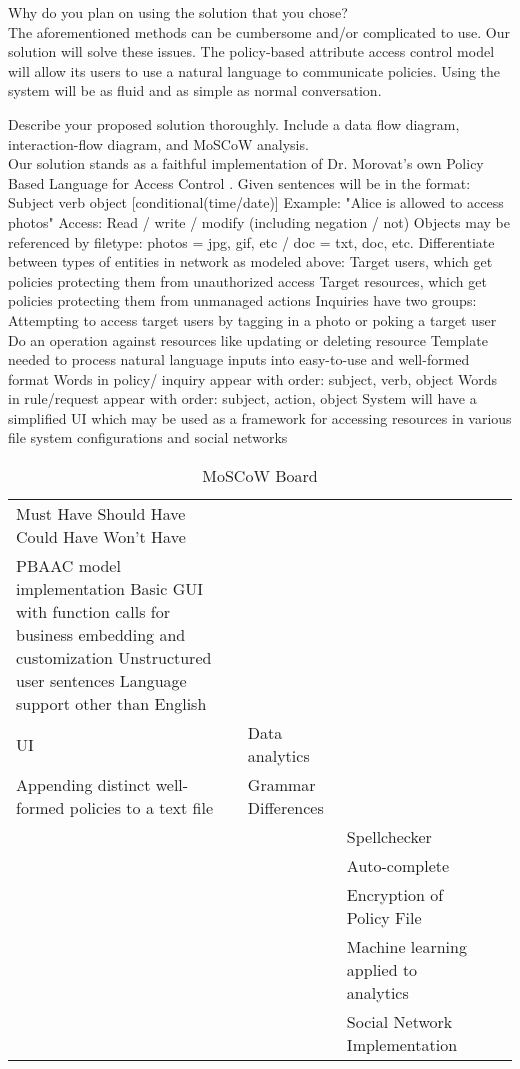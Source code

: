 \documentclass[12pt]{article}
\begin{document}
Why do you plan on using the solution that you chose? \\
The aforementioned methods can be cumbersome and/or complicated to use. Our solution will solve these issues. The policy-based attribute access control model will allow its users to use a natural language to communicate policies. Using the system will be as fluid and as simple as normal conversation. 

Describe your proposed solution thoroughly. Include a data flow diagram, interaction-flow diagram, and MoSCoW analysis. \\
Our solution stands as a faithful implementation of Dr. Morovat's own Policy Based Language for Access Control \cite{morovat16}.
Given sentences will be in the format: Subject verb object [conditional(time/date)]
Example: "Alice is allowed to access photos"
Access: Read / write / modify (including negation / not)
Objects may be referenced by filetype: photos = jpg, gif, etc / doc = txt, doc, etc.
Differentiate between types of entities in network as modeled above:
Target users, which get policies protecting them from unauthorized access
Target resources, which get policies protecting them from unmanaged actions
Inquiries have two groups:
Attempting to access target users by tagging in a photo or poking a target user
Do an operation against resources like updating or deleting resource
Template needed to process natural language inputs into easy-to-use and well-formed format
Words in policy/ inquiry appear with order: subject, verb, object
Words in rule/request appear with order: subject, action, object
System will have a simplified UI which may be used as a framework for accessing resources in various file system configurations and social networks

\begin{table}[]
\caption{MoSCoW Board}
\begin{tabular}{lllll}
 Must Have  Should Have  Could Have  Won't Have  \\
 PBAAC model implementation  Basic GUI with function calls for business embedding and customization  Unstructured user sentences  Language support other than English  \\
 UI  &  Data analytics  & \\
 Appending distinct well-formed policies to a text file  &  Grammar Differences  & \\
 &  &   Spellchecker   & \\
 &  &   Auto-complete   & \\
 &  &   Encryption of Policy File   & \\
 &  &   Machine learning applied to analytics   & \\
 &  &   Social Network Implementation   & \\
\end{tabular}
\end{table}
\end{document}
